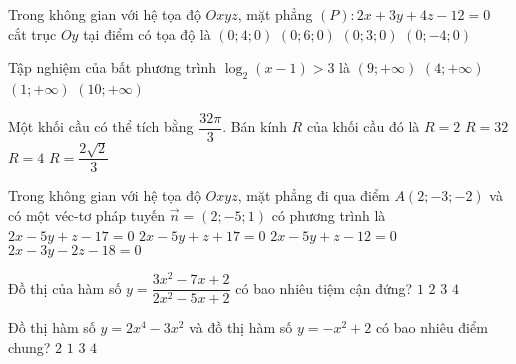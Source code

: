 \begin{ex}%
	Trong không gian với hệ tọa độ $Oxyz$, mặt phẳng $(P):2x+3y+4z-12=0$ cắt trục $Oy$ tại điểm có tọa độ là
	\choice
	{\True $(0;4;0)$}
	{$(0;6;0)$}
	{$(0;3;0)$}
	{$(0;-4;0)$}
\end{ex}
\begin{ex}%
	Tập nghiệm của bất phương trình $\log_2(x-1)>3$ là 
	\choice
	{\True $(9;+\infty)$}
	{$(4;+\infty)$}
	{$(1;+\infty)$}
	{$(10;+\infty)$}
\end{ex}
\begin{ex}%
	Một khối cầu có thể tích bằng $\dfrac{32\pi}{3}$. Bán kính $R$ của khối cầu đó là
	\choice
	{\True $R=2$}
	{$R=32$}
	{$R=4$}
	{$R=\dfrac{2\sqrt{2}}{3}$}
\end{ex}
\begin{ex}%
	Trong không gian với hệ tọa độ $Oxyz$, mặt phẳng đi qua điểm $A(2;-3;-2)$ và có một véc-tơ pháp tuyến $\vec{n}=(2;-5;1)$ có phương trình là
	\choice
	{\True $2x-5y+z-17=0$}
	{$2x-5y+z+17=0$}
	{$2x-5y+z-12=0$}
	{$2x-3y-2z-18=0$}
\end{ex}
\begin{ex}%
	Đồ thị của hàm số $y=\dfrac{3x^2-7x+2}{2x^2-5x+2}$ có bao nhiêu tiệm cận đứng?
	\choice
	{\True $1$}
	{$2$}
	{$3$}
	{$4$}
\end{ex}
\begin{ex}%
	Đồ thị hàm số $y=2x^4-3x^2$ và đồ thị hàm số $y=-x^2+2$ có bao nhiêu điểm chung?
	\choice
	{\True $2$}
	{$1$}
	{$3$}
	{$4$}
	\loigiai{Ta có: 
		{\allowdisplaybreaks
			\begin{align*}
				&2x^4-3x^2=-x^2+2\Leftrightarrow 2x^4-2x^2-2=0\\
				\Leftrightarrow&\left[\begin{aligned}& x^2=\dfrac{1-\sqrt{5}}{2}\quad \text{(loại)} \\
					& x^2=\dfrac{1+\sqrt{5}}{2} 
				\end{aligned}\right.\Leftrightarrow x=\pm \sqrt{\dfrac{1+\sqrt{5}}{2}.}
	\end{align*}}}
\end{ex}
